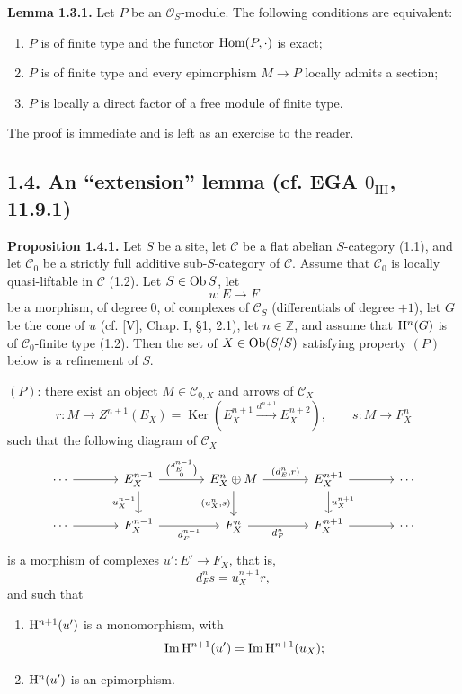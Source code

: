\documentclass[11pt]{article}
\providecommand{\Ker}{\operatorname{Ker}}
\begin{document}
\textbf{Lemma 1.3.1.} Let \(P\) be an \(\mathcal O_S\)-module. The following conditions are equivalent:
\begin{enumerate}[label=(\roman*)]
\item \(P\) is of finite type and the functor \(\operatorname{Hom}(P,\cdot)\) is exact;
\item \(P\) is of finite type and every epimorphism \(M\to P\) locally admits a section;
\item \(P\) is locally a direct factor of a free module of finite type.
\end{enumerate}
The proof is immediate and is left as an exercise to the reader.

\subsection*{1.4. An ``extension'' lemma (cf. EGA \(0_{\mathrm{III}}\), 11.9.1)}

\textbf{Proposition 1.4.1.} Let \(S\) be a site, let \(\mathcal C\) be a flat abelian \(S\)-category (1.1), and let \(\mathcal C_0\) be a strictly full additive sub-\(S\)-category of \(\mathcal C\). Assume that \(\mathcal C_0\) is locally quasi-liftable in \(\mathcal C\) (1.2). Let \(S\in\operatorname{Ob} S\), let
\[
  u:E\longrightarrow F
\]
be a morphism, of degree \(0\), of complexes of \(\mathcal C_S\) (differentials of degree \(+1\)), let \(G\) be the cone of \(u\) (cf. [V], Chap. I, §1, 2.1), let \(n\in\mathbb Z\), and assume that \(\mathrm H^n(G)\) is of \(\mathcal C_0\)-finite type (1.2). Then the set of \(X\in\operatorname{Ob}(S/S)\) satisfying property \((P)\) below is a refinement of \(S\).

\((P)\): there exist an object \(M\in\mathcal C_{0,X}\) and arrows of \(\mathcal C_X\)
\[
  r:M\longrightarrow Z^{n+1}(E_X)=
  \Ker\!\left(E_X^{n+1}\xrightarrow{d^{n+1}}E_X^{n+2}\right),
  \qquad
  s:M\longrightarrow F_X^n
\]
such that the following diagram of \(\mathcal C_X\)
\[
\begin{tikzcd}[column sep=large]
\cdots \arrow[r] & E_X^{n-1}
 \arrow[r,"{\binom{d_E^{n-1}}{0}}"]
 \arrow[d,"u_X^{n-1}"'] &
E_X^n\oplus M
 \arrow[r,"{(d_E^n,r)}"]
 \arrow[d,"{(u_X^n,s)}"'] &
E_X^{n+1} \arrow[r] \arrow[d,"u_X^{n+1}"] &
\cdots\\
\cdots \arrow[r] & F_X^{n-1} \arrow[r,"d_F^{n-1}"'] &
F_X^n \arrow[r,"d_F^n"'] &
F_X^{n+1} \arrow[r] &
\cdots
\end{tikzcd}
\]
is a morphism of complexes \(u':E'\to F_X\), that is,
\[
  d_F^n s=u_X^{n+1}r,
\]
and such that
\begin{enumerate}[label=(\roman*)]
\item \(\mathrm H^{n+1}(u')\) is a monomorphism, with
\[
  \operatorname{Im}\mathrm H^{n+1}(u')=\operatorname{Im}\mathrm H^{n+1}(u_X);
\]
\item \(\mathrm H^n(u')\) is an epimorphism.
\end{enumerate}
\end{document}
